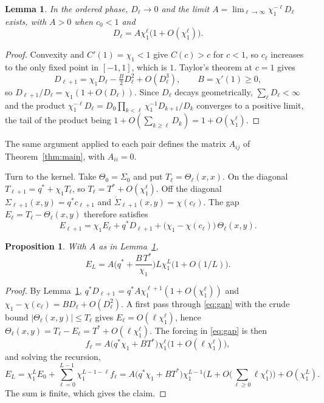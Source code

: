 \documentclass[11pt]{amsart}
\newtheorem{lemma}[theorem]{Lemma}
\newtheorem{proposition}[theorem]{Proposition}
\theoremstyle{remark}\newtheorem{remark}[theorem]{Remark}
\begin{document}
\begin{lemma}\label{lem:cmap}
In the ordered phase, $D_\ell\to0$ and the limit $A=\lim_{\ell\to\infty}\chi_1^{-\ell}D_\ell$ exists, with $A>0$ when
$c_0<1$ and
\[
D_\ell=A\chi_1^{\ell}\big(1+O(\chi_1^{\ell})\big).
\]
\end{lemma}

\begin{proof}
Convexity and $C'(1)=\chi_1<1$ give $C(c)>c$ for $c<1$, so $c_\ell$ increases to the only fixed point in $[-1,1]$, which is
$1$. Taylor's theorem at $c=1$ gives
\[
D_{\ell+1}=\chi_1D_\ell-\tfrac{B}{2}D_\ell^2+O(D_\ell^3),\qquad B=\chi'(1)\ge0,
\]
so $D_{\ell+1}/D_\ell=\chi_1(1+O(D_\ell))$. Since $D_\ell$ decays geometrically, $\sum_\ell D_\ell<\infty$ and the product
$\chi_1^{-\ell}D_\ell=D_0\prod_{k<\ell}\chi_1^{-1}D_{k+1}/D_k$ converges to a positive limit, the tail of the product being
$1+O(\sum_{k\ge\ell}D_k)=1+O(\chi_1^\ell)$.
\end{proof}

The same argument applied to each pair defines the matrix $A_{ij}$ of Theorem~\ref{thm:main}, with $A_{ii}=0$.

Turn to the kernel. Take $\Theta_0=\Sigma_0$ and put $T_\ell=\Theta_\ell(x,x)$. On the diagonal $T_{\ell+1}=q^*+\chi_1T_\ell$,
so $T_\ell=T^*+O(\chi_1^\ell)$. Off the diagonal $\Sigma_{\ell+1}(x,y)=q^*c_{\ell+1}$ and $\dot\Sigma_{\ell+1}(x,y)=\chi(c_\ell)$.
The gap $E_\ell=T_\ell-\Theta_\ell(x,y)$ therefore satisfies
\begin{equation}\label{eq:gap}
E_{\ell+1}=\chi_1E_\ell+q^*D_{\ell+1}+\big(\chi_1-\chi(c_\ell)\big)\,\Theta_\ell(x,y).
\end{equation}

\begin{proposition}\label{prop:two}
With $A$ as in Lemma~\ref{lem:cmap},
\[
E_L=A\Big(q^*+\frac{B\,T^*}{\chi_1}\Big)L\chi_1^L\big(1+O(1/L)\big).
\]
\end{proposition}

\begin{proof}
By Lemma~\ref{lem:cmap}, $q^*D_{\ell+1}=q^*A\chi_1^{\ell+1}(1+O(\chi_1^\ell))$ and $\chi_1-\chi(c_\ell)=BD_\ell+O(D_\ell^2)$.
A first pass through \eqref{eq:gap} with the crude bound $|\Theta_\ell(x,y)|\le T_\ell$ gives $E_\ell=O(\ell\chi_1^\ell)$,
hence $\Theta_\ell(x,y)=T_\ell-E_\ell=T^*+O(\ell\chi_1^\ell)$. The forcing in \eqref{eq:gap} is then
\[
f_\ell=A\big(q^*\chi_1+BT^*\big)\chi_1^\ell\big(1+O(\ell\chi_1^\ell)\big),
\]
and solving the recursion,
\[
E_L=\chi_1^LE_0+\sum_{\ell=0}^{L-1}\chi_1^{L-1-\ell}f_\ell
=A\big(q^*\chi_1+BT^*\big)\chi_1^{L-1}\Big(L+O\Big(\sum_{\ell\ge0}\ell\chi_1^\ell\Big)\Big)+O(\chi_1^L).
\]
The sum is finite, which gives the claim.
\end{proof}
\end{document}
